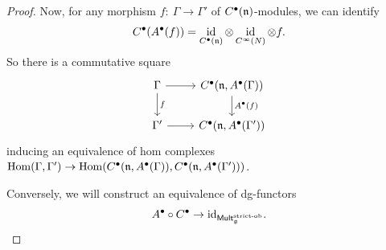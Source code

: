 \documentclass[pdftex]{sigma}
\numberwithin{equation}{section}
\def\cat#1{\ensuremath{\mathsf{#1}}}
\DeclareMathOperator{\Mult}{\cat{Mult}}
\def\bu{\bullet}
\DeclareMathOperator{\id}{id}
\begin{document}
\begin{proof}
	Now, for any morphism $f \colon \ \Gamma \to \Gamma'$ of $C^\bullet(\mathfrak n)$-modules, we can identify
	\begin{equation*}
	C^\bu(A^\bu(f)) = \id_{C^\bu(\fn)} \otimes \id_{C^\infty(N)} \otimes f.
	\end{equation*}
	So there is a commutative square
	\begin{equation*}
	\begin{tikzcd}
	\Gamma \arrow[d , "f"] \arrow[r] & C^\bullet(\fn , A^\bullet(\Gamma)) \arrow[d, "A^\bullet(f)"] \\
	\Gamma' \arrow[r] &C^\bullet(\fn , A^\bullet(\Gamma'))
	\end{tikzcd}
	\end{equation*}
	inducing an equivalence of hom complexes $\mathrm{Hom}(\Gamma, \Gamma') \to \mathrm{Hom}(C^\bullet(\mathfrak n , A^\bullet(\Gamma)), C^\bullet(\mathfrak n , A^\bullet(\Gamma')))$.
	
	
	Conversely, we will construct an equivalence of dg-functors
	\begin{equation*}
	A^\bullet \circ C^\bullet \to \mathrm{id}_{\Mult_\fg^{\text{\rm strict-ob}}} .
	\end{equation*}
	

\end{proof}
\end{document}
